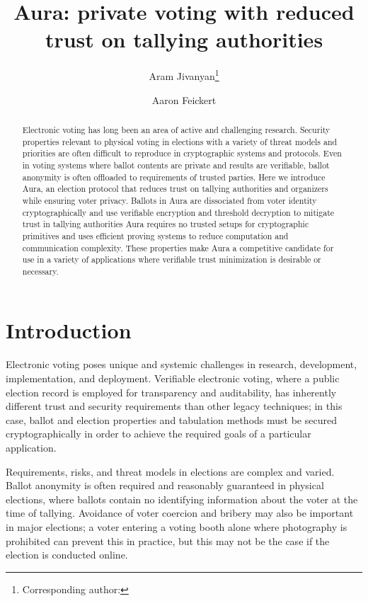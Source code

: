 \documentclass{llncs}
\begin{document}
\title{Aura: private voting with reduced trust on tallying authorities}
\author{Aram Jivanyan\thanks{Corresponding author: } \and Aaron Feickert}
\maketitle

\begin{abstract}
	Electronic voting has long been an area of active and challenging research.
	Security properties relevant to physical voting in elections with a variety of threat models and priorities are often difficult to reproduce in cryptographic systems and protocols.
    Even in voting systems where ballot contents are private and results are verifiable, ballot anonymity is often offloaded to requirements of trusted parties.
	Here we introduce Aura, an election protocol that reduces trust on tallying authorities and organizers while ensuring voter privacy.
	Ballots in Aura are dissociated from voter identity cryptographically and use verifiable encryption and threshold decryption to mitigate trust in tallying authorities
    Aura requires no trusted setups for cryptographic primitives and uses efficient proving systems to reduce computation and communication complexity.
	These properties make Aura a competitive candidate for use in a variety of applications where verifiable trust minimization is desirable or necessary.
\end{abstract}


\section{Introduction}

Electronic voting poses unique and systemic challenges in research, development, implementation, and deployment.
Verifiable electronic voting, where a public election record is employed for transparency and auditability, has inherently different trust and security requirements than other legacy techniques; in this case, ballot and election properties and tabulation methods must be secured cryptographically in order to achieve the required goals of a particular application.

Requirements, risks, and threat models in elections are complex and varied.
Ballot anonymity is often required and reasonably guaranteed in physical elections, where ballots contain no identifying information about the voter at the time of tallying.
Avoidance of voter coercion and bribery may also be important in major elections; a voter entering a voting booth alone where photography is prohibited can prevent this in practice, but this may not be the case if the election is conducted online.
\end{document}
